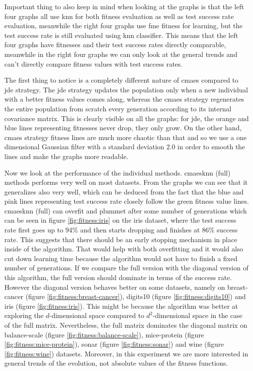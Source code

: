 \documentclass[12pt,a4paper]{report}
\begin{document}
Important thing to also keep in mind when looking at the graphs is that the left four graphs all use \ac{knn} for both fitness evaluation as well as test success rate evaluation, meanwhile the right four graphs use \ac{fme} fitness for learning, but the test success rate is still evaluated using \ac{knn} classifier. This means that the left four graphs have fitnesses and their test success rates directly comparable, meanwhile in the right four graphs we can only look at the general trends and can't directly compare fitness values with test success rates.

The first thing to notice is a completely different nature of \ac{cmaes} compared to \ac{jde} strategy. The \ac{jde} strategy updates the population only when a new individual with a better fitness values comes along, whereas the \ac{cmaes} strategy regenerates the entire population from scratch every generation according to its internal covariance matrix. This is clearly visible on all the graphs: for \ac{jde}, the orange and blue lines representing fitnesses never drop, they only grow. On the other hand, \ac{cmaes} strategy fitness lines are much more chaotic than that and so we use a one dimensional Gaussian filter with a standard deviation 2.0 in order to smooth the lines and make the graphs more readable. 

Now we look at the performance of the individual methods. \ac{cmaesknn} (full) methods performs very well on most datasets. From the graphs we can see that it generalizes also very well, which can be deduced from the fact that the blue and pink lines representing test success rate closely follow the green fitness value lines. \ac{cmaesknn} (full) can overfit and plummet after some number of generations which can be seen in figure \ref{fig:fitness:iris} on the iris dataset, where the test success rate first goes up to 94\% and then starts dropping and finishes at 86\% success rate. This suggests that there should be an early stopping mechanism in place inside of the algorithm. That would help with both overfitting and it would also cut down learning time because the algorithm would not have to finish a fixed number of generations. If we compare the full version with the diagonal version of this algorithm, the full version should dominate in terms of the success rate. However the diagonal version behaves  better on some datasets, namely on breast-cancer (figure \ref{fig:fitness:breast-cancer}), digits10 (figure \ref{fig:fitness:digits10}) and iris (figure \ref{fig:fitness:iris}). This might be because the algorithm was better at exploring the $d$-dimensional space compared to $d^2$-dimensional space in the case of the full matrix. Nevertheless, the full matrix dominates the diagonal matrix on balance-scale (figure \ref{fig:fitness:balance-scale}), mice-protein (figure \ref{fig:fitness:mice-protein}), sonar (figure \ref{fig:fitness:sonar}) and wine (figure \ref{fig:fitness:wine}) datasets. Moreover, in this experiment we are more interested in general trends of the evolution, not absolute values of the fitness functions.
\end{document}
